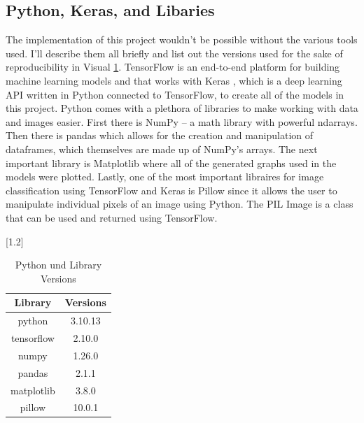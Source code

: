 \documentclass[12pt]{article}
\begin{document}
        \subsection{Python, Keras, and Libaries}
                
            The implementation of this project wouldn’t be possible without the various tools used. 
            I’ll describe them all briefly and list out the versions used for the sake of reproducibility in Visual \ref{py-versions}. 
            TensorFlow \cite{abadi2016-tensorflow} is an end-to-end platform for building machine learning models 
            and that works with Keras \cite{chollet2015-keras}, which is a deep learning API written in Python connected to TensorFlow, 
            to create all of the models in this project. 
            Python comes with a plethora of libraries to make working with data and images easier. 
            First there is NumPy \cite{harris2020-numpy} -- a math library with powerful ndarrays. 
            Then there is pandas \cite{reback2020-pandas} \cite{mckinney2010-pandas} 
            which allows for the creation and manipulation of dataframes, which themselves are made up of NumPy’s arrays. 
            The next important library is Matplotlib \cite{hunter2007-matplotlib} 
            where all of the generated graphs used in the models were plotted. 
            Lastly, one of the most important libraires for image classification using TensorFlow 
            and Keras is Pillow \cite{clark2015pillow} since it allows the user to manipulate individual pixels of an image using Python. 
            The PIL Image is a class that can be used and returned using TensorFlow.
                
            \begin{table}[htp]

                \begin{center} 

                \scalebox{1.2}[1.2]{
                \begin{tabular}{ | c | c | }
                \hline
                \textbf{Library}    &       \textbf{Versions} \\
                \hline
                python              &       3.10.13 \\ 
                tensorflow          &       2.10.0 \\
                numpy               &       1.26.0 \\
                pandas              &       2.1.1 \\
                matplotlib          &       3.8.0 \\
                pillow              &       10.0.1 \\
                
                \hline
                \end{tabular}
                }

                \caption{Python und Library Versions}
                \label{py-versions}

                \end{center}

            \end{table}
       
\end{document}
